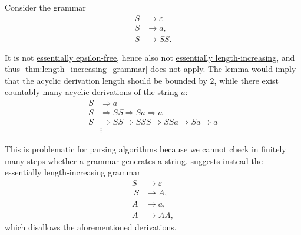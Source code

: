 \begin{example}\label{ex:unboudned_grammar_derivation_length}
  Consider the grammar
  \begin{equation}\label{eq:ex:unboudned_grammar_derivation_length/bad}
    \begin{aligned}
      S &\to \varepsilon \\
      S &\to a, \\
      S &\to SS.
    \end{aligned}
  \end{equation}

  It is not \hyperref[def:epsilon_free_grammar]{essentially epsilon-free}, hence also not \hyperref[def:length_increasing_grammar]{essentially length-increasing}, and thus \cref{thm:length_increasing_grammar} does not apply. The lemma would imply that the acyclic derivation length should be bounded by \( 2 \), while there exist countably many acyclic derivations of the string \( a \):
  \begin{equation*}
    \begin{aligned}
      S &\Rightarrow a \\
      S &\Rightarrow SS \Rightarrow Sa \Rightarrow a \\
      S &\Rightarrow SS \Rightarrow SSS \Rightarrow SSa \Rightarrow Sa \Rightarrow a \\
        &\vdots
    \end{aligned}
  \end{equation*}

  This is problematic for parsing algorithms because we cannot check in finitely many steps whether a grammar generates a string.  suggests instead the essentially length-increasing grammar
  \begin{equation*}
    \begin{aligned}
      S &\to \varepsilon \\\
      S &\to A, \\
      A &\to a, \\
      A &\to AA,
    \end{aligned}
  \end{equation*}
  which disallows the aforementioned derivations.
\end{example}

